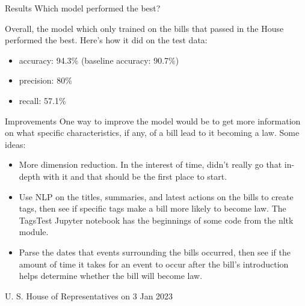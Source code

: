 \documentclass[handout,
	12pt]{beamer}
\begin{document}
\begin{frame}{Results}{}
Which model performed the best?  

\pause
\vspace{1pc}
Overall, the model which only trained on the bills that passed in the House performed the best.  Here's how it did on the test data:

\pause
\begin{itemize}
\item accuracy: 94.3\% \pause (baseline accuracy: 90.7\%)
\pause
\item precision: 80\%
\pause
\item recall: 57.1\%
\end{itemize}
\end{frame}
	
\begin{frame}{Improvements}{}
One way to improve the model would be to get more information on what specific characteristics, if any, of a bill lead to it becoming a law.  \pause Some ideas:
\pause
{\small
\begin{itemize}
\itemsep0em
\item More dimension reduction.  In the interest of time, didn't really go that in-depth with it and that should be the first place to start.
\pause
\item Use NLP on the titles, summaries, and latest actions on the bills to create tags, then see if specific tags make a bill more likely to become law.  The TagsTest Jupyter notebook has the beginnings of some code from the nltk module.
\pause
\item Parse the dates that events surrounding the bills occurred, then see if the amount of time it takes for an event to occur after the bill's introduction helps determine whether the bill will become law.
\end{itemize}
}
\end{frame}

	
\begin{frame}{}{}
\vspace{17pc}
\begin{flushright}
\hspace{50pt}
{\color{gray}U. S. House of Representatives on 3 Jan 2023}
\end{flushright}
\end{frame}

\end{document}

